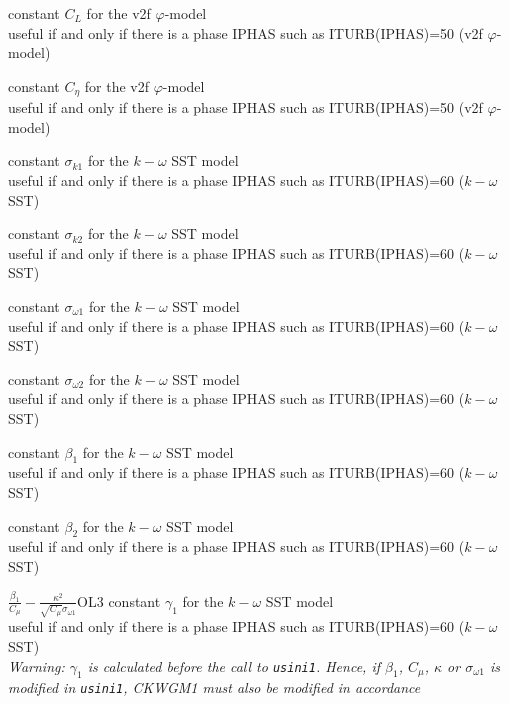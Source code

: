 {constant $C_L$ for the v2f $\varphi$-model\\
useful if and only if there is a phase IPHAS such as ITURB(IPHAS)=50
(v2f $\varphi$-model)}

{constant $C_\eta$ for the v2f $\varphi$-model\\
useful if and only if there is a phase IPHAS such as ITURB(IPHAS)=50
(v2f $\varphi$-model)}


{constant $\sigma_{k1}$ for the $k-\omega$ SST model\\
useful if and only if there is a phase IPHAS such as ITURB(IPHAS)=60
($k-\omega$ SST)}

{constant $\sigma_{k2}$ for the $k-\omega$ SST model\\
useful if and only if there is a phase IPHAS such as ITURB(IPHAS)=60
($k-\omega$ SST)}

{constant $\sigma_{\omega 1}$ for the $k-\omega$ SST model\\
useful if and only if there is a phase IPHAS such as ITURB(IPHAS)=60
($k-\omega$ SST)}

{constant $\sigma_{\omega 2}$ for the $k-\omega$ SST model\\
useful if and only if there is a phase IPHAS such as ITURB(IPHAS)=60
($k-\omega$ SST)}

{constant $\beta_1$ for the $k-\omega$ SST model\\
useful if and only if there is a phase IPHAS such as ITURB(IPHAS)=60
($k-\omega$ SST)}

{constant $\beta_2$ for the $k-\omega$ SST model\\
useful if and only if there is a phase IPHAS such as ITURB(IPHAS)=60
($k-\omega$ SST)}

{$\frac{\beta_1}{C_\mu}-\frac{\kappa^2}{\sqrt{C_\mu}\sigma_{\omega 1}}$}{O}{L3}
{constant $\gamma_1$ for the $k-\omega$ SST model\\
useful if and only if there is a phase IPHAS such as ITURB(IPHAS)=60
($k-\omega$ SST)\\
{\em Warning: $\gamma_1$ is calculated before the call to
\texttt{usini1}. Hence, if $\beta_1$, $C_\mu$, $\kappa$ or $\sigma_{\omega 1}$
is modified in \texttt{usini1}, CKWGM1 must also be modified in accordance}}

